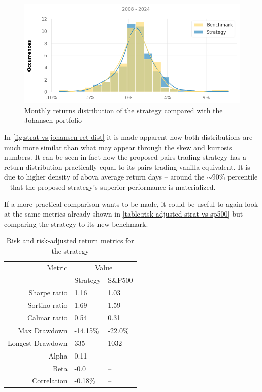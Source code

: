 \begin{figure}[ht]
    \includegraphics[width=\linewidth]{assets/strat-vs-johansen-ret-dist.png}
    \caption{Monthly returns distribution of the strategy compared with the Johansen portfolio}
    \label{fig:strat-vs-johansen-ret-dist}
\end{figure}

In \autoref{fig:strat-vs-johansen-ret-dist} it is made apparent how both distributions are much more similar than what may appear through the skew and kurtosis numbers. It can be seen in fact how the proposed pairs-trading strategy has a return distribution practically equal to its pairs-trading vanilla equivalent. It is due to higher density of abova average return days -- around the $\sim$90\% percentile -- that the proposed strategy's superior performance is materialized.    

If a more practical comparison wants to be made, it could be useful to again look at the same metrics already shown in \autoref{table:risk-adjusted-strat-vs-sp500} but comparing the strategy to its new benchmark. 

\begin{table}[ht]
    \centering
    \begin{tabular}{rll}
        \toprule
        Metric & \multicolumn{2}{c}{Value} \\ 
        \cmidrule(lr){2-3}
            & Strategy & S\&P500 \\
        \midrule
        Sharpe ratio & 1.16 & 1.03 \\
        Sortino ratio & 1.69 & 1.59 \\
        Calmar ratio & 0.54 & 0.31 \\
        Max Drawdown & -14.15\% & -22.0\% \\
        Longest Drawdown & 335 & 1032 \\
        Alpha & 0.11 & -- \\
        Beta & -0.0 & -- \\
        Correlation & -0.18\% & -- \\
        \bottomrule
    \end{tabular}
    \caption{Risk and risk-adjusted return metrics for the strategy}
    \label{table:risk-adjusted-strat-vs-johansen}
\end{table}

